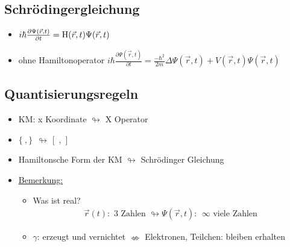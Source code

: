 						\subsection{Schrödingergleichung}
							\begin{itemize}
								\item $i \hbar \frac{\partial \Psi(\vec{r}, t)}{\partial t} = \mathrm{H}(\vec{r},t)\Psi(\vec{r}, t)$
								\item ohne Hamiltonoperator $i \hbar \frac{\partial \Psi(\vec{r}, t)}{\partial t} = \frac{- \hbar ^2}{2m} \Delta \Psi(\vec{r}, t) + V(\vec{r}, t) \Psi(\vec{r}, t)$
							\end{itemize}
								\subsection{Quantisierungsregeln}
							\begin{itemize}
							\item KM: x Koordinate $\looparrowright$ X Operator
							\item $\{~, \}~~\looparrowright$ [~,~]
							\item Hamiltonsche Form der KM $\looparrowright$ Schrödinger Gleichung
							\item \underline{Bemerkung:}
							\begin{itemize}
							\item Was ist real?
							\begin{align*}
							\vec{r}(t):\text{ 3 Zahlen } \looparrowright \Psi\left(\vec{r}, t\right):~~ \infty \text{ viele Zahlen}
							\end{align*}
							\item $\gamma$: erzeugt und vernichtet $\nLeftrightarrow$ Elektronen, Teilchen: bleiben erhalten
							\end{itemize}
							\end{itemize}
